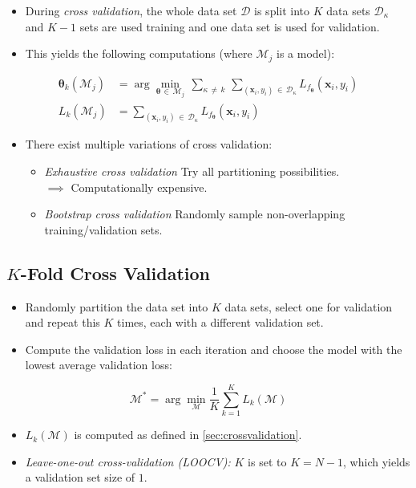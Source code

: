 \documentclass[a4paper, 11pt, accentcolor = tud3b]{tudreport}
\renewcommand{\vec}[1]{\mathbf{#1}}
\begin{document}
				\begin{itemize}
					\item During \emph{cross validation}, the whole data set \(\mathcal{D}\) is split into \(K\) data sets \( \mathcal{D}_\kappa \) and \(K - 1\) sets are used training and one data set is used for validation.
					\item This yields the following computations (where \(\mathcal{M}_j\) is a model):
				\end{itemize}
				\begin{align}
					\vec{\theta}_k (\mathcal{M}_j) &= \arg\min_{\vec{\theta} \,\in\, \mathcal{M}_j} \, \sum_{\kappa \,\neq\, k} \, \sum_{(\vec{x}_i, y_i) \,\in\, \mathcal{D}_\kappa} L_{f_{\vec{\theta}}} (\vec{x}_i, y_i) \\
					L_k(\mathcal{M}_j) &=  \sum_{(\vec{x}_i, y_i) \,\in\, \mathcal{D}_\kappa} L_{f_{\vec{\theta}}} (\vec{x}_i, y_i)
				\end{align}
				\begin{itemize}
					\item There exist multiple variations of cross validation:
						\begin{itemize}
							\item \emph{Exhaustive cross validation} \tabto{5cm} Try all partitioning possibilities. \\
								\tabto{5cm} \qquad \( \implies \) Computationally expensive.
							\item \emph{Bootstrap cross validation} \tabto{5cm} Randomly sample non-overlapping training/validation sets.
						\end{itemize}
				\end{itemize}

			\subsection{\(K\)-Fold Cross Validation}
				\begin{itemize}
					\item Randomly partition the data set into \(K\) data sets, select one for validation and repeat this \(K\) times, each with a different validation set.
					\item Compute the validation loss in each iteration and choose the model with the lowest average validation loss:
				\end{itemize}
				\begin{equation}
					\mathcal{M}^\ast = \arg\min_\mathcal{M} \frac{1}{K} \sum_{k = 1}^{K} L_k(\mathcal{M})
				\end{equation}
				\begin{itemize}
					\item \(L_k(\mathcal{M})\) is computed as defined in \ref{sec:crossvalidation}.
					\item \emph{Leave-one-out cross-validation (LOOCV):} \(K\) is set to \( K = N - 1 \), which yields a validation set size of \(1\).
				\end{itemize}
\end{document}
